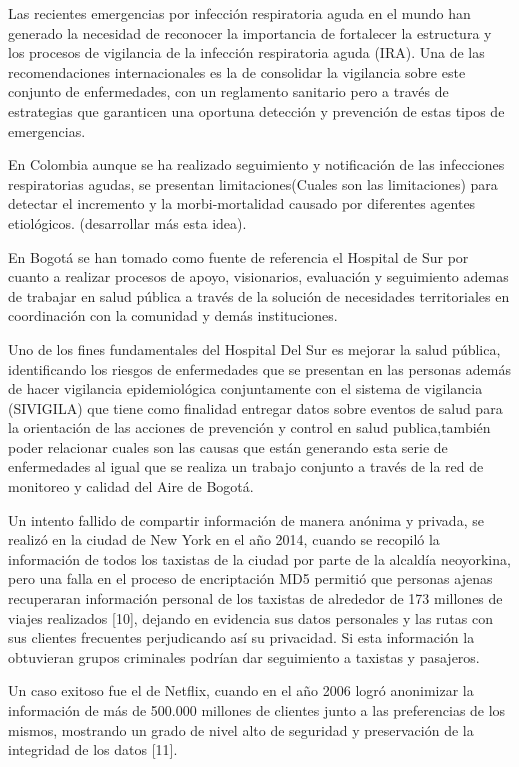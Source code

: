 \documentclass[a4paper, 11pt, oneside]{article}
\theoremstyle{definition}
\theoremstyle{remark}
\begin{document}
Las recientes emergencias por infección respiratoria aguda en el mundo han generado la necesidad de reconocer la importancia de fortalecer la estructura y los procesos de vigilancia de la infección respiratoria
aguda (IRA). Una de las recomendaciones internacionales es la de consolidar la vigilancia sobre este conjunto de enfermedades,
con un reglamento sanitario pero a través de estrategias que garanticen una oportuna detección y prevención de estas tipos de emergencias.

En Colombia aunque se ha realizado seguimiento y notificación de las infecciones respiratorias agudas, se presentan limitaciones(Cuales son las limitaciones) para detectar el incremento y la morbi-mortalidad causado por diferentes agentes etiológicos. (desarrollar más esta idea).

En Bogotá se han tomado como fuente de referencia el Hospital de Sur por cuanto a realizar procesos de apoyo, visionarios, evaluación y seguimiento ademas de trabajar en salud pública a través de la solución de necesidades territoriales en coordinación  con la comunidad y demás instituciones.

Uno de los fines fundamentales del Hospital Del Sur es mejorar la salud pública, identificando los riesgos de enfermedades que se presentan en las personas además de hacer vigilancia epidemiológica conjuntamente con el sistema de vigilancia (SIVIGILA) que tiene como finalidad entregar datos sobre eventos de salud para  la orientación  de las acciones de prevención  y control en salud publica,también poder relacionar cuales son las causas que están generando esta serie de enfermedades al igual que se realiza un trabajo conjunto a través  de la red de monitoreo y calidad del Aire de Bogotá.

Un intento fallido de compartir información de manera anónima y privada, se realizó en la ciudad de New York en el año 2014, cuando se recopiló la información de todos los taxistas de la ciudad por parte de la alcaldía neoyorkina, pero una falla en el proceso de encriptación MD5 permitió que personas ajenas recuperaran información personal de los taxistas de alrededor de 173 millones de viajes realizados [10], dejando en evidencia sus datos personales y las rutas con sus clientes frecuentes  perjudicando así su privacidad. Si esta información la obtuvieran grupos criminales podrían dar seguimiento a taxistas y pasajeros.

Un caso exitoso fue el de Netflix, cuando en el año 2006 logró anonimizar la información de más de 500.000 millones de clientes junto a las preferencias de los mismos, mostrando un grado de nivel alto de seguridad y preservación de la integridad de los datos [11].
\end{document}

